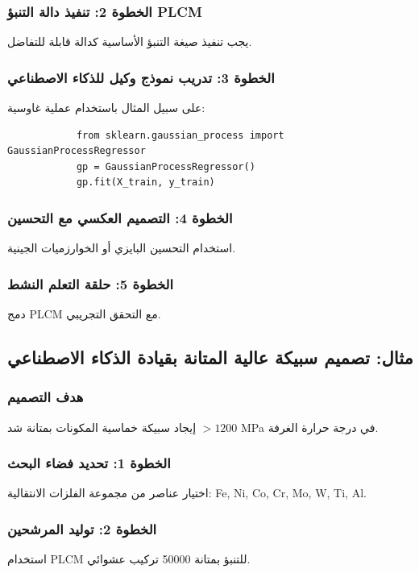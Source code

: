 \documentclass[11pt,a4paper]{article}
\begin{document}
\begin{otherlanguage}{arabic}
		\subsubsection{الخطوة 2: تنفيذ دالة التنبؤ PLCM}
		يجب تنفيذ صيغة التنبؤ الأساسية كدالة قابلة للتفاضل.
		
		\subsubsection{الخطوة 3: تدريب نموذج وكيل للذكاء الاصطناعي}
		على سبيل المثال باستخدام عملية غاوسية:
		\begin{verbatim}
			from sklearn.gaussian_process import GaussianProcessRegressor
			gp = GaussianProcessRegressor()
			gp.fit(X_train, y_train)
		\end{verbatim}
		
		\subsubsection{الخطوة 4: التصميم العكسي مع التحسين}
		استخدام التحسين البايزي أو الخوارزميات الجينية.
		
		\subsubsection{الخطوة 5: حلقة التعلم النشط}
		دمج PLCM مع التحقق التجريبي.
		
		\subsection{مثال: تصميم سبيكة عالية المتانة بقيادة الذكاء الاصطناعي}
		
		\subsubsection{هدف التصميم}
		إيجاد سبيكة خماسية المكونات بمتانة شد \(> 1200\) MPa في درجة حرارة الغرفة.
		
		\subsubsection{الخطوة 1: تحديد فضاء البحث}
		اختيار عناصر من مجموعة الفلزات الانتقالية: Fe, Ni, Co, Cr, Mo, W, Ti, Al.
		
		\subsubsection{الخطوة 2: توليد المرشحين}
		استخدام PLCM للتنبؤ بمتانة 50000 تركيب عشوائي.
		

\end{otherlanguage}
\end{document}
